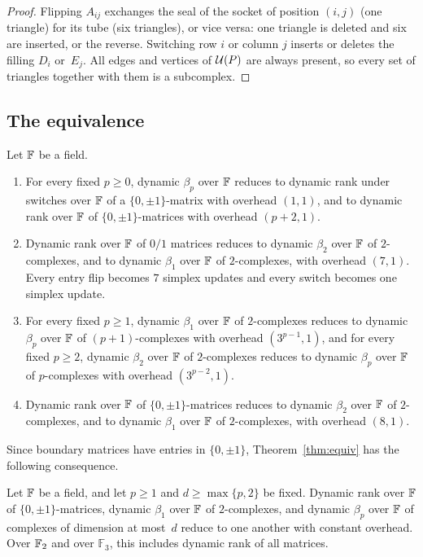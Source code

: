 \begin{proof}
Flipping $A_{ij}$ exchanges the seal of the socket of position $(i,j)$ (one triangle) for its tube (six triangles), or vice versa: one triangle is deleted and six are inserted, or the reverse.
Switching row $i$ or column $j$ inserts or deletes the filling $D_i$ or~$E_j$.
All edges and vertices of $\mathcal{U}(P)$ are always present, so every set of triangles together with them is a subcomplex.
\end{proof}

\subsection{The equivalence}\label{sec:equiv-thm}

\begin{theorem}\label{thm:equiv}
Let $\mathbb{F}$ be a field.
\begin{enumerate}[label=(\roman*)]
\item For every fixed $p\ge0$, dynamic $\beta_p$ over $\mathbb{F}$ reduces to dynamic rank under switches over $\mathbb{F}$ of a $\{0,\pm1\}$-matrix with overhead $(1,1)$, and to dynamic rank over $\mathbb{F}$ of $\{0,\pm1\}$-matrices with overhead $(p+2,1)$.
\item\label{it:equiv-ii} Dynamic rank over $\mathbb{F}$ of $0/1$ matrices reduces to dynamic $\beta_2$ over $\mathbb{F}$ of $2$-complexes, and to dynamic $\beta_1$ over $\mathbb{F}$ of $2$-complexes, with overhead $(7,1)$. Every entry flip becomes $7$ simplex updates and every switch becomes one simplex update.
\item For every fixed $p\ge1$, dynamic $\beta_1$ over $\mathbb{F}$ of $2$-complexes reduces to dynamic $\beta_{p}$ over $\mathbb{F}$ of $(p+1)$-complexes with overhead $(3^{p-1},1)$, and for every fixed $p\ge2$, dynamic $\beta_2$ over $\mathbb{F}$ of $2$-complexes reduces to dynamic $\beta_p$ over $\mathbb{F}$ of $p$-complexes with overhead $(3^{p-2},1)$.
\item Dynamic rank over $\mathbb{F}$ of $\{0,\pm1\}$-matrices reduces to dynamic $\beta_2$ over $\mathbb{F}$ of $2$-complexes, and to dynamic $\beta_1$ over $\mathbb{F}$ of $2$-complexes, with overhead $(8,1)$.
\end{enumerate}
\end{theorem}

Since boundary matrices have entries in $\{0,\pm1\}$, Theorem~\ref{thm:equiv} has the following consequence.

\begin{corollary}\label{cor:equiv}
Let $\mathbb{F}$ be a field, and let $p\ge1$ and $d\ge\max\{p,2\}$ be fixed.
Dynamic rank over $\mathbb{F}$ of $\{0,\pm1\}$-matrices, dynamic $\beta_1$ over $\mathbb{F}$ of $2$-complexes, and dynamic $\beta_p$ over $\mathbb{F}$ of complexes of dimension at most~$d$ reduce to one another with constant overhead.
Over $\mathbb{F}_2$ and over $\mathbb{F}_3$, this includes dynamic rank of all matrices.
\end{corollary}

